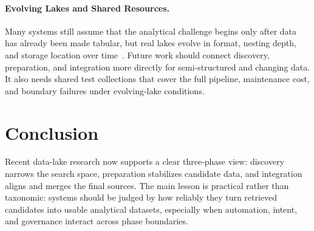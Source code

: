 \documentclass[sigconf]{acmart}
\begin{document}
\paragraph{Evolving Lakes and Shared Resources.}
Many systems still assume that the analytical challenge begins only after data has already been made tabular, but real lakes evolve in format, nesting depth, and storage location over time~\cite{10.14778/3681954.3682005,10.14778/3626292.3626294}. Future work should connect discovery, preparation, and integration more directly for semi-structured and changing data. It also needs shared test collections that cover the full pipeline, maintenance cost, and boundary failures under evolving-lake conditions.

\section{Conclusion}
Recent data-lake research now supports a clear three-phase view: discovery narrows the search space, preparation stabilizes candidate data, and integration aligns and merges the final sources. The main lesson is practical rather than taxonomic: systems should be judged by how reliably they turn retrieved candidates into usable analytical datasets, especially when automation, intent, and governance interact across phase boundaries.



\end{document}
